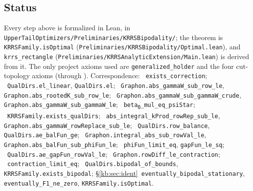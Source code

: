 \subsection{Status}
\label{kb:sec:status}
Every step above is formalized in Lean, in \texttt{UpperTailOptimizers/Preliminaries/KRRSBipodality/}; the
theorem is \texttt{KRRSFamily.isOptimal} (\texttt{Preliminaries/KRRSBipodality/Optimal.lean}), and
\texttt{krrs\_rectangle} (\texttt{Preliminaries/KRRSAnalyticExtension/Main.lean}) is derived from it.  The only project axioms
used are \texttt{generalized\_holder} and the four cut-topology axioms (through
).  Correspondence:
~\texttt{exists\_correction};
~\texttt{QualDirs.el\_linear}, \texttt{QualDirs.el};
~\texttt{Graphon.abs\_gammaW\_sub\_row\_le},
\texttt{Graphon.abs\_rootedK\_sub\_row\_le};
~\texttt{Graphon.abs\_gammaW\_sub\_gammaW\_crude},
\texttt{Graphon.abs\_gammaW\_sub\_gammaW\_le};
~\texttt{beta\textsubscript{0}\_mul\_eq\_psiStar};
~\texttt{KRRSFamily.exists\_qualDirs};
~\texttt{abs\_integral\_kProd\_rowRep\_sub\_le},
\texttt{Graphon.abs\_gammaW\_rowReplace\_sub\_le};
~\texttt{QualDirs.row\_balance}, \texttt{QualDirs.ae\_balFun\_ge};
~\texttt{Graphon.integral\_abs\_sub\_rowVal\_le},
\texttt{Graphon.abs\_balFun\_sub\_phiFun\_le};
~\texttt{phiFun\_limit\_eq}, \texttt{gapFun\_le\_sq};
~\texttt{QualDirs.ae\_gapFun\_rowVal\_le};
~\texttt{Graphon.rowDiff\_le\_contraction};
~\texttt{contraction\_limit\_eq};
~\texttt{QualDirs.bipodal\_of\_bounds},
\texttt{KRRSFamily.exists\_bipodal};
\S\ref{kb:sec:ident}~\texttt{eventually\_bipodal\_stationary},
\texttt{eventually\_F1\_ne\_zero}, \texttt{KRRSFamily.isOptimal}.
